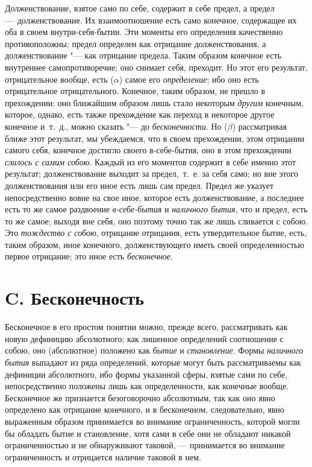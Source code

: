 Долженствование, взятое само по себе, содержит в себе предел, а предел
—~долженствование. Их взаимоотношение есть само конечное, содержащее их оба
в своем внутри-себя-бытии. Эти моменты его определения качественно
противоположны; предел определен как отрицание долженствования, а
долженствование "--- как отрицание предела. Таким образом конечное есть
внутреннее самопротиворечие; оно снимает себя, преходит. Но этот его
результат, отрицательное вообще, есть ($\alpha $) самое его
{\em определение}; ибо оно есть отрицательное
отрицательного. Конечное, таким образом, не прешло в прехождении; оно
ближайшим образом лишь стало некоторым {\em другим}
конечным, которое, однако, есть также прехождение как переход в некоторое
другое конечное и~т.~д., можно сказать "--- до
{\em бесконечности}. Но ($\beta $) рассматривая ближе
этот результат, мы убеждаемся, что в своем прехождении, этом отрицании
самого себя, конечное достигло своего в-себе-бытия, оно в этом прехождении
{\em слилось с самим собою}. Каждый из его моментов
содержит в себе именно этот результат; долженствование выходит за
предел,~т.~е. за себя само; но вне этого долженствования или его иное
есть лишь сам предел. Предел же указует непосредственно вовне на свое
иное, которое есть долженствование, а последнее есть то же самое
раздвоение {\em в-себе-бытия} и
{\em наличного бытия}, что и предел, есть то же самое;
выходя вне себя, оно поэтому точно так же лишь сливается с собою. Это
{\em тождество с собою}, отрицание отрицания, есть
утвердительное бытие, есть, таким образом, иное конечного,
долженствующего иметь своей определенностью первое отрицание; это иное
есть {\em бесконечное}.

\section[C. Бесконечность]{C. Бесконечность}
Бесконечное в его простом понятии можно, прежде всего, рассматривать как
новую дефиницию абсолютного; как лишенное определений соотношение с собою,
оно (абсолютное) положено как {\em бытие} и
{\em становление}. Формы
{\em наличного бытия} выпадают из ряда определений,
которые могут быть рассматриваемы как дефиниции абсолютного, ибо формы
указанной сферы, взятые сами по себе, непосредственно положены лишь как
определенности, как конечные вообще. Бесконечное же признается
безоговорочно абсолютным, так как оно явно определено как отрицание
конечного, и в бесконечном, следовательно, явно выраженным образом
принимается во внимание ограниченность, которой могли бы обладать бытие и
становление, хотя сами в себе они не обладают никакой ограниченностью и не
обнаруживают таковой, — принимается во внимание ограниченность и отрицается
наличие таковой в нем.

